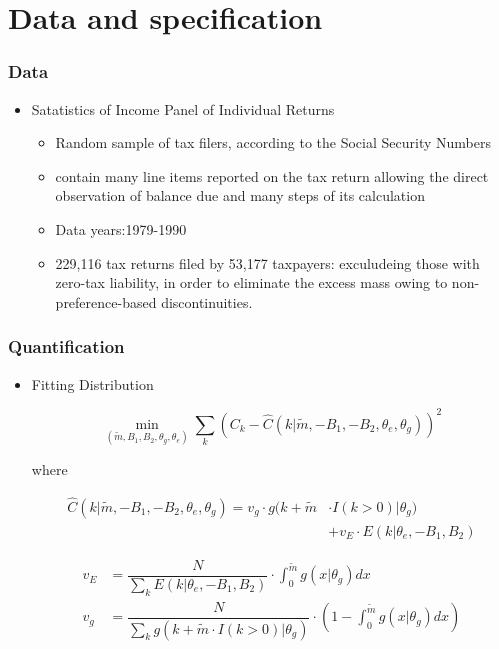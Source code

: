 \documentclass[dvipdfmx,12pt]{beamer}
\begin{document}
\section{Data and specification}
\begin{frame}\frametitle{Data}
  \begin{itemize}
    \item Satatistics of Income Panel of Individual Returns

    \begin{itemize}
      \item Random sample of tax filers, according to the Social Security
      Numbers

      \item contain many line items reported on the tax return allowing
      the direct observation of balance due and many steps of its calculation

      \item Data years:1979-1990

      \item 229,116 tax returns filed by 53,177 taxpayers:
      exculudeing those with zero-tax liability, in order to eliminate
      the excess mass owing to non-preference-based discontinuities.
    \end{itemize}
  \end{itemize}
\end{frame}
\begin{frame}\frametitle{Quantification}
  \begin{itemize}
    \item Fitting Distribution

    \[
    \min_{(\tilde{m}, B_1, B_2, \theta_g, \theta_e)}
    \sum_k \left( C_k - \hat{C}(k | \tilde{m}, -B_1, -B_2, \theta_e,
    \theta_g) \right)^2
    \]

    where

    \begin{align*}
      \hat{C}(k| \tilde{m}, -B_1, -B_2, \theta_e, \theta_g)
      = v_g \cdot g(k + \tilde{m} &\cdot I(k>0) | \theta_g) \\
      &+ v_E \cdot E(k | \theta_e, -B_1, B_2)
    \end{align*}

    \begin{align*}
      v_E &= \dfrac{N}{\sum_k E(k|\theta_e, -B_1, B_2)}
      \cdot \int_0^{\tilde{m}}g(x|\theta_g)dx \\
      v_g &= \dfrac{N}{\sum_k g(k+\tilde{m}\cdot I(k>0)|\theta_g)}
      \cdot \left( 1-\int_0^{\tilde{m}}g(x|\theta_g)dx \right)
    \end{align*}

  \end{itemize}
\end{frame}
\end{document}
